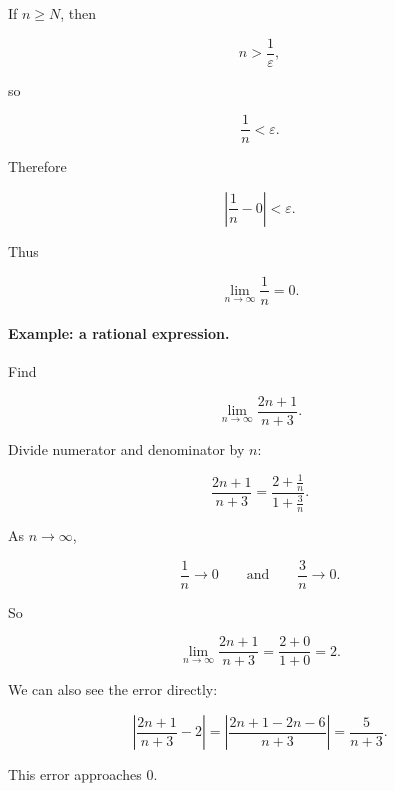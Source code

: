 If \(n\ge N\), then

\[
n>\frac1{\varepsilon},
\]

so

\[
\frac1n<\varepsilon.
\]

Therefore

\[
\left|\frac1n-0\right|<\varepsilon.
\]

Thus

\[
\lim_{n\to\infty}\frac1n=0.
\]

\paragraph{Example: a rational expression.}
Find

\[
\lim_{n\to\infty}\frac{2n+1}{n+3}.
\]

Divide numerator and denominator by \(n\):

\[
\frac{2n+1}{n+3}
=
\frac{2+\frac1n}{1+\frac3n}.
\]

As \(n\to\infty\),

\[
\frac1n\to0
\qquad\text{and}\qquad
\frac3n\to0.
\]

So

\[
\lim_{n\to\infty}\frac{2n+1}{n+3}
=
\frac{2+0}{1+0}
=
2.
\]

We can also see the error directly:

\[
\left|\frac{2n+1}{n+3}-2\right|
=
\left|\frac{2n+1-2n-6}{n+3}\right|
=
\frac5{n+3}.
\]

This error approaches \(0\).

